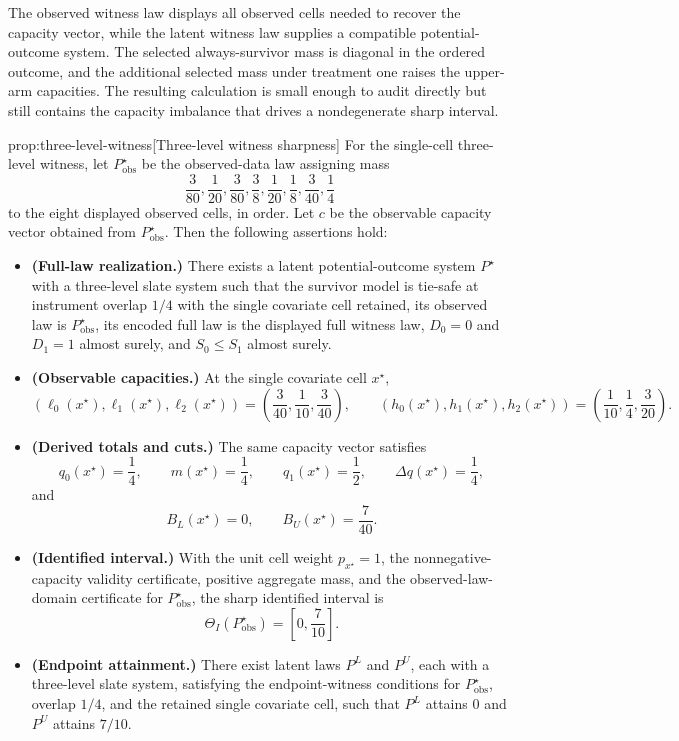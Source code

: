The observed witness law  displays all observed cells needed to recover the capacity vector, while the latent witness law  supplies a compatible potential-outcome system.  The selected always-survivor mass is diagonal in the ordered outcome, and the additional selected mass under treatment one raises the upper-arm capacities.  The resulting calculation is small enough to audit directly but still contains the capacity imbalance that drives a nondegenerate sharp interval.

\begin{theoremv}{prop:three-level-witness}[Three-level witness sharpness]
For the single-cell three-level witness, let \(P_{\mathrm{obs}}^{\star}\) be the observed-data law assigning mass
\[
\frac{3}{80},\frac{1}{20},\frac{3}{80},\frac{3}{8},\frac{1}{20},\frac{1}{8},\frac{3}{40},\frac{1}{4}
\]
to the eight displayed observed cells, in order.  Let \(c\) be the observable capacity vector obtained from \(P_{\mathrm{obs}}^{\star}\).  Then the following assertions hold:
\begin{itemize}
\item \textbf{(Full-law realization.)} There exists a latent potential-outcome system \(P^{\star}\) with a three-level slate system such that the survivor model is tie-safe at instrument overlap \(1/4\) with the single covariate cell retained, its observed law is \(P_{\mathrm{obs}}^{\star}\), its encoded full law is the displayed full witness law, \(D_0=0\) and \(D_1=1\) almost surely, and \(S_0\le S_1\) almost surely.
\item \textbf{(Observable capacities.)} At the single covariate cell \(x^{\star}\),
\[
(\ell_0(x^{\star}),\ell_1(x^{\star}),\ell_2(x^{\star}))
=
\left(\frac{3}{40},\frac{1}{10},\frac{3}{40}\right),
\qquad
(h_0(x^{\star}),h_1(x^{\star}),h_2(x^{\star}))
=
\left(\frac{1}{10},\frac{1}{4},\frac{3}{20}\right).
\]
\item \textbf{(Derived totals and cuts.)} The same capacity vector satisfies
\[
q_0(x^{\star})=\frac{1}{4},\qquad
m(x^{\star})=\frac{1}{4},\qquad
q_1(x^{\star})=\frac{1}{2},\qquad
\Delta q(x^{\star})=\frac{1}{4},
\]
and
\[
B_L(x^{\star})=0,
\qquad
B_U(x^{\star})=\frac{7}{40}.
\]
\item \textbf{(Identified interval.)} With the unit cell weight \(p_{x^{\star}}=1\), the nonnegative-capacity validity certificate, positive aggregate mass, and the observed-law-domain certificate for \(P_{\mathrm{obs}}^{\star}\), the sharp identified interval is
\[
\Theta_I(P_{\mathrm{obs}}^{\star})
=
\left[0,\frac{7}{10}\right].
\]
\item \textbf{(Endpoint attainment.)} There exist latent laws \(P^L\) and \(P^U\), each with a three-level slate system, satisfying the endpoint-witness conditions for \(P_{\mathrm{obs}}^{\star}\), overlap \(1/4\), and the retained single covariate cell, such that \(P^L\) attains \(0\) and \(P^U\) attains \(7/10\).
\end{itemize}
\end{theoremv}

